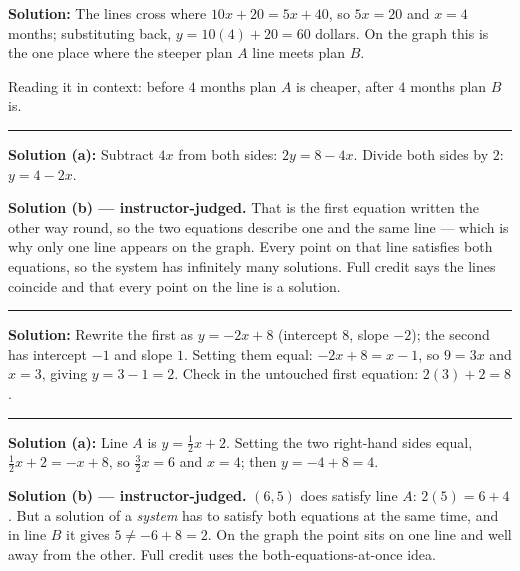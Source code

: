 \documentclass[12pt]{article}
\begin{document}

\textbf{Solution:} \quad The lines cross where $10x + 20 = 5x + 40$, so $5x = 20$ and $x = 4$
months; substituting back, $y = 10(4) + 20 = 60$ dollars. On the graph this is the one place where
the steeper plan $A$ line meets plan $B$. 

\noindent Reading it in context: before $4$ months plan $A$ is cheaper, after $4$ months plan $B$ is.

\vspace{0.15cm}\noindent\rule{\linewidth}{0.2pt}


\textbf{Solution (a):} \quad Subtract $4x$ from both sides: $2y = 8 - 4x$. Divide both sides by
$2$: $y = 4 - 2x$. 

\noindent\textbf{Solution (b) --- instructor-judged.} That is the first equation written the other
way round, so the two equations describe one and the same line --- which is why only one line
appears on the graph. Every point on that line satisfies both equations, so the system has
infinitely many solutions. Full credit says the lines coincide and that every point on the line is
a solution.

\vspace{0.15cm}\noindent\rule{\linewidth}{0.2pt}


\textbf{Solution:} \quad Rewrite the first as $y = -2x + 8$ (intercept $8$, slope $-2$); the second
has intercept $-1$ and slope $1$. Setting them equal: $-2x + 8 = x - 1$, so $9 = 3x$ and $x = 3$,
giving $y = 3 - 1 = 2$. Check in the untouched first equation: $2(3) + 2 = 8$. 

\vspace{0.15cm}\noindent\rule{\linewidth}{0.2pt}


\textbf{Solution (a):} \quad Line $A$ is $y = \tfrac{1}{2}x + 2$. Setting the two right-hand sides
equal, $\tfrac{1}{2}x + 2 = -x + 8$, so $\tfrac{3}{2}x = 6$ and $x = 4$; then $y = -4 + 8 = 4$.

\noindent\textbf{Solution (b) --- instructor-judged.} $(6, 5)$ does satisfy line $A$:
$2(5) = 6 + 4$. But a solution of a \emph{system} has to satisfy both equations at the same time,
and in line $B$ it gives $5 \ne -6 + 8 = 2$. On the graph the point sits on one line and well away
from the other. Full credit uses the both-equations-at-once idea.
\end{document}

